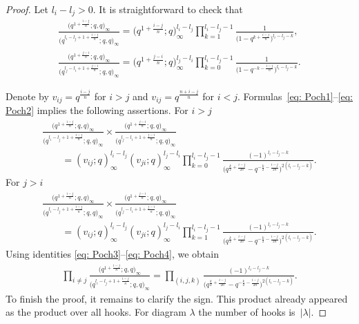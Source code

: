 \documentclass[pdftex]{sigma}
\numberwithin{equation}{section}
\theoremstyle{definition}
\begin{document}
\begin{proof}
Let $l_i-l_j>0$. It is straightforward to check that
\begin{gather}
\frac{\big( q^{1+\frac{i-j}{n}} ;q,q \big)_{\infty}}{\big(q^{l_i - l_j+1+\frac{i-j}{n}};q,q \big)_{\infty}} = \big(q^{1+\frac{i-j}{n}} ; q \big)_{\infty}^{l_i-l_j} \prod_{k=1}^{l_i-l_j-1} \frac{1}{\big(1-q^{k+\frac{i-j}{n}} \big)^{l_i-l_j-k}}, \label{eq: Poch1} \\
\frac{\big(q^{1+\frac{j-i}{n}} ;q,q \big)_{\infty}}{\big(q^{l_j - l_i+1+\frac{j-i}{n}} ;q,q \big)_{\infty}} = \big(q^{1+\frac{j-i}{n}}; q \big)_{\infty}^{l_j-l_i} \prod_{k=0}^{l_i-l_j-1} \frac{1}{\big(1-q^{-k-\frac{i-j}{n}} \big)^{l_i-l_j-k}}. \label{eq: Poch2}
\end{gather}

Denote by $v_{ij} = q^{\frac{i-j}{n}}$ for $i>j$ and $v_{ij} = q^{\frac{n+i-j}{n}} $ for $i<j$. Formulas~\eqref{eq: Poch1}--\eqref{eq: Poch2} implies the following assertions. For $i>j$
\begin{gather}
\frac{\big( q^{1+\frac{i-j}{n}} ;q,q \big)_{\infty}}{\big(q^{l_i - l_j+1+\frac{i-j}{n}};q,q \big)_{\infty}} \times \frac{\big(q^{1+\frac{j-i}{n}};q,q \big)_{\infty}}{\big(q^{l_j - l_i+1+\frac{j-i}{n}};q,q \big)_{\infty}} \nonumber \\
\qquad{}= ( v_{ij}; q )_{\infty}^{l_i-l_j} ( v_{ji}; q )_{\infty}^{l_j-l_i} \prod_{k=0}^{l_i-l_j-1} \frac{(-1)^{l_i - l_j - k}}{\big(q^{\frac{k}{2}+\frac{i-j}{2n}} -q^{-\frac{k}{2}-\frac{i-j}{2n}} \big)^{2(l_i-l_j-k)}}. \label{eq: Poch3}
\end{gather}
For $j>i$
\begin{gather}
\frac{\big( q^{1+\frac{i-j}{n}} ;q,q \big)_{\infty}}{ \big(q^{l_i - l_j+1+\frac{i-j}{n}};q,q \big)_{\infty}} \times \frac{\big(q^{1+\frac{j-i}{n}};q,q \big)_{\infty}}{ \big(q^{l_j - l_i+1+\frac{j-i}{n}};q,q \big)_{\infty}} \nonumber \\
\qquad{}= ( v_{ij}; q )_{\infty}^{l_i-l_j} ( v_{ji}; q )_{\infty}^{l_j-l_i} \prod_{k=1}^{l_i-l_j-1} \frac{(-1)^{l_i - l_j - k}}{\big(q^{\frac{k}{2}+\frac{i-j}{2n}} -q^{-\frac{k}{2}-\frac{i-j}{2n}} \big)^{2(l_i-l_j-k)}}. \label{eq: Poch4}
\end{gather}
Using identities \eqref{eq: Poch3}--\eqref{eq: Poch4}, we obtain
\begin{gather*}
\prod_{i \neq j} \frac{\big( q^{1+\frac{i-j}{n}} ;q,q \big)_{\infty}}{\big(q^{l_i - l_j+1+\frac{i-j}{n}};q,q \big)_{\infty}} = \prod_{(i,j,k)} \frac{(-1)^{l_i - l_j - k}}{\big(q^{\frac{k}{2}+\frac{i-j}{2n}} -q^{-\frac{k}{2}-\frac{i-j}{2n}} \big)^{2(l_i-l_j-k)}}.
\end{gather*}
To finish the proof, it remains to clarify the sign. This product already appeared as the product over all hooks. For diagram $\lambda$ the number of hooks is~$| \lambda |$.
\end{proof}
\end{document}
